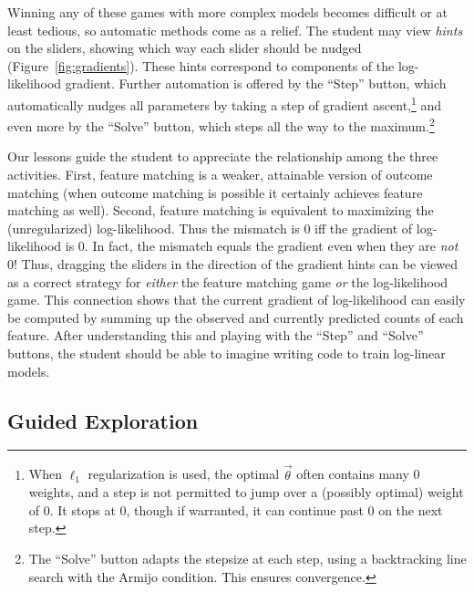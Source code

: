 \documentclass[11pt,letterpaper]{article}
\begin{document}
Winning any of these games with more complex models becomes difficult
or at least tedious, so automatic methods come as a relief.  The
student may view {\em hints} on the sliders, showing which way each
slider should be nudged (Figure~\ref{fig:gradients}).  These hints
correspond to components of the log-likelihood gradient.  Further
automation is offered by the ``Step'' button, which automatically
nudges all parameters by taking a step of gradient
ascent,\footnote{When $\ell_1$ regularization is used, the optimal
  $\vec{\theta}$ often contains many 0 weights, and a step
  is not permitted to jump over a (possibly optimal) weight of
  0.
  It stops at 0, though if warranted, it can continue past 0 on the next step.} 
and even more by the ``Solve''
button, which steps all the way to the maximum.\footnote{The ``Solve''
  button adapts the stepsize at each step, using a backtracking line
  search with the Armijo condition.  This ensures convergence.}

Our lessons guide the student to appreciate the relationship
among the three activities.  First, feature matching is a weaker,
attainable version of outcome matching (when outcome matching is
possible it certainly achieves feature matching as well).  Second,
feature matching is equivalent to maximizing the (unregularized)
log-likelihood.  Thus the mismatch is 0 iff the gradient of
log-likelihood is 0.  In fact, the mismatch equals the gradient even
when they are {\em not} 0!  Thus, dragging the sliders in the
direction of the gradient hints can be viewed as a correct strategy
for {\em either} the feature matching game {\em or} the log-likelihood
game.  This connection shows that the current gradient of log-likelihood can
easily be computed by summing up the observed and currently predicted
counts of each feature.  After understanding this and playing with the ``Step'' and
``Solve'' buttons, the student should be able to imagine writing code
to train log-linear models.


\subsection{Guided Exploration}
\end{document}
